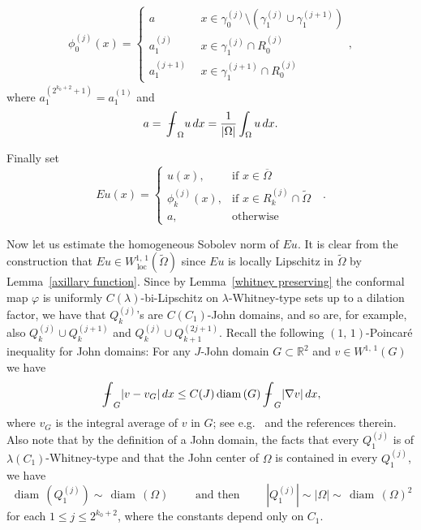 \documentclass[reqno,11pt]{amsart}
\def\loc{{\mathop\mathrm{\,loc\,}}}
\def\wz{\widetilde}
\def\bint{{\ifinner\rlap{\bf\kern.35em--}
\int\else\rlap{\bf\kern.45em--}\int\fi}\ignorespaces}
\def\diam{{\mathop\mathrm{\,diam\,}}}
\numberwithin{equation}{section}
\theoremstyle{remark}
\def\bint{{\ifinner\rlap{\bf\kern.35em--}
\int\else\rlap{\bf\kern.45em--}\int\fi}\ignorespaces}
\begin{document}
\begin{align*}
\phi_{0}^{(j)}(x) = \left\{ \begin{array}{ll}
a \ & \ x\in \gamma_0^{(j)}\setminus(\gamma_{1}^{(j)}\cup \gamma_{1}^{(j+1)})\\
a_{1}^{(j)} \ & \ x\in \gamma_{1}^{(j)}\cap R_{0}^{(j)}\\
a_{1}^{(j+1)} \ & \ x\in \gamma_{1}^{(j+1)}\cap R_{0}^{(j)}
\end{array} \right. ,
\end{align*}
where $ a_1^{( 2^{k_0+2}+1)}=a_1^{(1)}$ and $$a=\bint_{\Omega} u\, dx=\frac 1 {|\Omega|}\int_{\Omega} u\, dx.$$


Finally set 
$$Eu(x)=
 \begin{cases}
 u(x), & \text{if }x \in \overline{\Omega}\\
 \phi_{k}^{(j)}(x), & \text{if $x\in   R_{k}^{(j)}\cap \wz \Omega$ }\\
a, & \text{otherwise} 
 \end{cases}.
$$



Now let us estimate the homogeneous Sobolev norm of $Eu$.
It is clear from the construction that $Eu\in W^{1,\,1}_{\loc}(\wz\Omega)$ since $Eu$ is locally Lipschitz in $\wz \Omega$ by Lemma~\ref{axillary function}. 
Since by Lemma~\ref{whitney preserving} the conformal map $\varphi$ is uniformly $C(\lambda)$-bi-Lipschitz on $\lambda$-Whitney-type sets up to a dilation factor, we have that $Q_k^{(j)}$'s are $C(C_1)$-John domains, and so are, for example, also $Q_k^{(j)}\cup Q_k^{(j+1)}$ and $Q_k^{(j)}\cup Q_{k+1}^{(2j+1)}$. Recall the following $(1,\,1)$-Poincar\'e inequality for John domains: For any $J$-John domain $G \subset \mathbb R^2$ and  $v\in W^{1,\,1}(G)$ we have
$$\bint_{G} |v-v_G|\, dx \le C(J) \diam(G) \bint_{G}  |\nabla v|\, dx, $$
where $v_G$ is the integral average of $v$ in $G$; 
see e.g.\ \cite{BK1995} and the references therein. Also note that by the definition of a John domain, the facts that every $Q_1^{(j)}$ is of $\lambda(C_1)$-Whitney-type  and that the John center of $\Omega$ is contained in every $Q_1^{(j)}$, we have 
\begin{equation}\label{equ 30}
\diam (Q_1^{(j)})\sim \diam(\Omega) \qquad \text{ and then } \qquad
|Q_1^{(j)}|\sim |\Omega|\sim \diam(\Omega)^2
\end{equation}
for each $1\le j\le   2^{k_0+2}$, where the constants depend only on $C_1$. 
\end{document}
